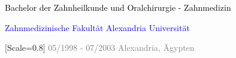 \vspace{0.7em}

{\setmainfont{Rubik Medium}\fontsize{10}{14}\selectfont\textcolor{black}{Bachelor der Zahnheilkunde und Oralchirurgie - Zahnmedizin}}

{\setmainfont{Rubik Medium}\fontsize{10}{14}\selectfont\textcolor{blue}{Zahnmedizinische Fakultät Alexandria Universität}}

{[Scale=0.8]
\textcolor{gray}{
\faCalendar\hspace{4pt}05/1998 - 07/2003\hspace{1.5em}
\faMapMarker*\hspace{4pt}Alexandria, Ägypten
}}\\[-15pt]


\vspace{0.7em}
